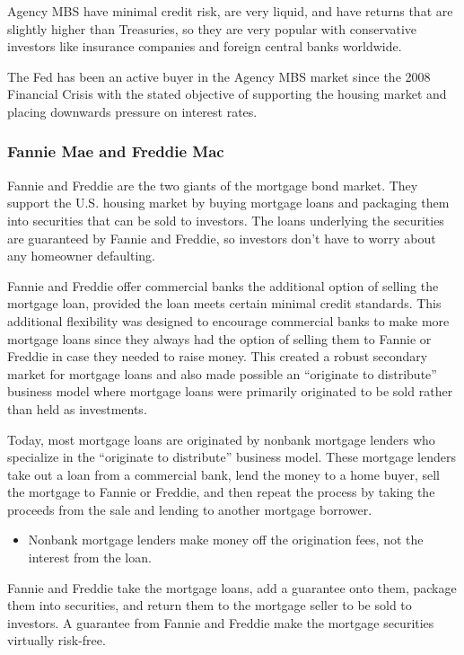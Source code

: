\documentclass[
]{book}
\providecommand{\tightlist}{%
  \setlength{\itemsep}{0pt}\setlength{\parskip}{0pt}}
\begin{document}
Agency MBS have minimal credit risk, are very liquid, and have returns that are slightly higher than Treasuries, so they are very popular with conservative investors like insurance companies and foreign central banks worldwide.

The Fed has been an active buyer in the Agency MBS market since the 2008 Financial Crisis with the stated objective of supporting the housing market and placing downwards pressure on interest rates.

\hypertarget{fannie-mae-and-freddie-mac}{%
\subsubsection{Fannie Mae and Freddie Mac}\label{fannie-mae-and-freddie-mac}}

Fannie and Freddie are the two giants of the mortgage bond market. They support the U.S. housing market by buying mortgage loans and packaging them into securities that can be sold to investors. The loans underlying the securities are guaranteed by Fannie and Freddie, so investors don't have to worry about any homeowner defaulting.

Fannie and Freddie offer commercial banks the additional option of selling the mortgage loan, provided the loan meets certain minimal credit standards. This additional flexibility was designed to encourage commercial banks to make more mortgage loans since they always had the option of selling them to Fannie or Freddie in case they needed to raise money. This created a robust secondary market for mortgage loans and also made possible an ``originate to distribute'' business model where mortgage loans were primarily originated to be sold rather than held as investments.

Today, most mortgage loans are originated by nonbank mortgage lenders who specialize in the ``originate to distribute'' business model. These mortgage lenders take out a loan from a commercial bank, lend the money to a home buyer, sell the mortgage to Fannie or Freddie, and then repeat the process by taking the proceeds from the sale and lending to another mortgage borrower.

\begin{itemize}
\tightlist
\item
  Nonbank mortgage lenders make money off the origination fees, not the interest from the loan.
\end{itemize}

Fannie and Freddie take the mortgage loans, add a guarantee onto them, package them into securities, and return them to the mortgage seller to be sold to investors. A guarantee from Fannie and Freddie make the mortgage securities virtually risk-free.
\end{document}
